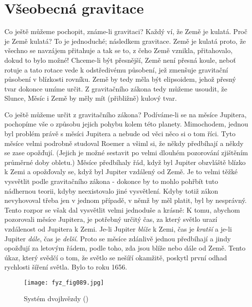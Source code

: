   \section{Všeobecná gravitace}
    Co ještě můžeme pochopit, známe-li gravitaci? Každý ví, že Země je kulatá. Proč je Země kulatá? 
    To je jednoduché; následkem gravitace. Země je kulatá proto, že všechno se navzájem přitahuje a 
    tak se to, z čeho Země vznikla, přitahovalo, dokud to bylo možné! Chceme-li být přesnější, Země 
    není přesná koule, neboť rotuje a tato rotace vede k odstředivému působení, jež zmenšuje 
    gravitační působení v blízkosti rovníku. Země by tedy měla být elipsoidem, jehož přesný tvar 
    dokonce umíme určit. Z gravitačního zákona tedy můžeme usoudit, že Slunce, Měsíc i Země by měly 
    mít (přibližně) kulový tvar.
    
    Co ještě můžeme určit z gravitačního zákona? Podíváme-li se na měsíce Jupitera, pochopíme vše o 
    způsobu jejich pohybu kolem této planety. Mimochodem, jednou byl problém právě s měsíci 
    Jupitera a nebude od věci něco si o tom říci. Tyto měsíce velmi podrobně studoval Roemer a 
    všiml si, že někdy předbíhají  a někdy se zase opožďují. (Jejich  
    je možné sestavit po velmi dlouhém pozorování zjištěním průměrné doby obletu.) Měsíce 
    předbíhaly řád, když byl Jupiter obzvláště blízko k Zemi a opožďovaly se, když byl Jupiter 
    vzdálený od Země. Je to velmi těžké vysvětlit podle gravitačního zákona - dokonce by to mohlo 
    pohřbít tuto nádhernou teorii, kdyby neexistovalo jiné vysvětlení. Kdyby totiž zákon 
    nevyhovoval třeba jen v jednom případě, v němž by měl platit, byl by nesprávný. Tento rozpor se 
    však dal vysvětlit velmi jednoduše a krásně: K tomu, abychom pozorovali měsíce Jupitera, je 
    potřebný určitý čas, za který světlo urazí vzdálenost od Jupitera k Zemi. Je-li Jupiter 
    \emph{blíže} k Zemi, čas je \emph{kratší} a je-li Jupiter \emph{dále}, čas je \emph{delší}. 
    Proto se měsíce zdánlivě jednou předbíhají a jindy opožďují za letovým řádem, podle toho, zda 
    jsou blíže nebo dále od Země. Tento úkaz, který svědčí o tom, že světlo se nešíří okamžitě, 
    poskytl první odhad rychlosti šíření světla. Bylo to roku 1656.
    
    \begin{figure}[ht!]  %
      \centering
      \texttt{[image: fyz\_fig089.jpg]}
      \caption{Systém dvojhvězdy (\cite[s.~99]{Feynman01})}
      \label{fyz:fig089}
    \end{figure}
    

